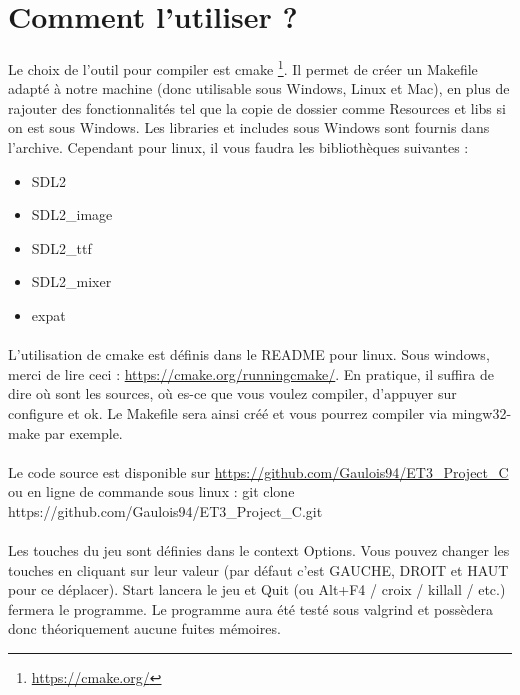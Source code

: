 \section{Comment l'utiliser ?}

\paragraph{} Le choix de l'outil pour compiler est cmake \footnote{\url{https://cmake.org/}}. Il permet de créer un Makefile adapté à notre machine (donc utilisable sous Windows, Linux et Mac), en plus de rajouter des fonctionnalités tel que la copie de dossier comme Resources et libs si on est sous Windows. Les libraries et includes sous Windows sont fournis dans l'archive. Cependant pour linux, il vous faudra les bibliothèques suivantes :

\begin{itemize}
	\item SDL2
	\item SDL2_image
	\item SDL2_ttf
	\item SDL2_mixer
	\item expat
\end{itemize}

\paragraph{} L'utilisation de cmake est définis dans le README pour linux. Sous windows, merci de lire ceci : \url{https://cmake.org/runningcmake/}. En pratique, il suffira de dire où sont les sources, où es-ce que vous voulez compiler, d'appuyer sur configure et ok. Le Makefile sera ainsi créé et vous pourrez compiler via mingw32-make par exemple.
\paragraph{} Le code source est disponible sur \url{https://github.com/Gaulois94/ET3\_Project\_C} ou en ligne de commande sous linux : git clone https://github.com/Gaulois94/ET3\_Project\_C.git
\paragraph{} Les touches du jeu sont définies dans le context Options. Vous pouvez changer les touches en cliquant sur leur valeur (par défaut c'est GAUCHE, DROIT et HAUT pour ce déplacer). Start lancera le jeu et Quit (ou Alt+F4 / croix / killall / etc.) fermera le programme. Le programme aura été testé sous valgrind et possèdera donc théoriquement aucune fuites mémoires.
